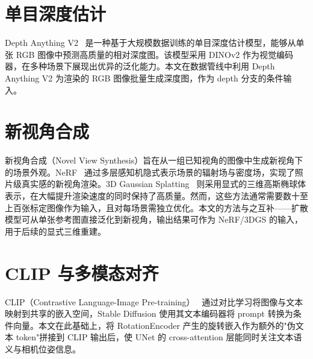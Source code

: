 \section{单目深度估计}

Depth Anything V2~\cite{yang2024depthanythingv2} 是一种基于大规模数据训练的单目深度估计模型，能够从单张 RGB 图像中预测高质量的相对深度图。该模型采用 DINOv2 作为视觉编码器，在多种场景下展现出优异的泛化能力。本文在数据管线中利用 Depth Anything V2 为渲染的 RGB 图像批量生成深度图，作为 depth 分支的条件输入。

\section{新视角合成}

新视角合成（Novel View Synthesis）旨在从一组已知视角的图像中生成新视角下的场景外观。NeRF~\cite{mildenhall2020nerf} 通过多层感知机隐式表示场景的辐射场与密度场，实现了照片级真实感的新视角渲染。3D Gaussian Splatting~\cite{kerbl3dgaussians} 则采用显式的三维高斯椭球体表示，在大幅提升渲染速度的同时保持了高质量。然而，这些方法通常需要数十至上百张标定图像作为输入，且对每场景需独立优化。本文的方法与之互补——扩散模型可从单张参考图直接泛化到新视角，输出结果可作为 NeRF/3DGS 的输入，用于后续的显式三维重建。

\section{CLIP 与多模态对齐}

CLIP（Contrastive Language-Image Pre-training）~\cite{radford2021clip} 通过对比学习将图像与文本映射到共享的嵌入空间，Stable Diffusion 使用其文本编码器将 prompt 转换为条件向量。本文在此基础上，将 RotationEncoder 产生的旋转嵌入作为额外的"伪文本 token"拼接到 CLIP 输出后，使 UNet 的 cross-attention 层能同时关注文本语义与相机位姿信息。
